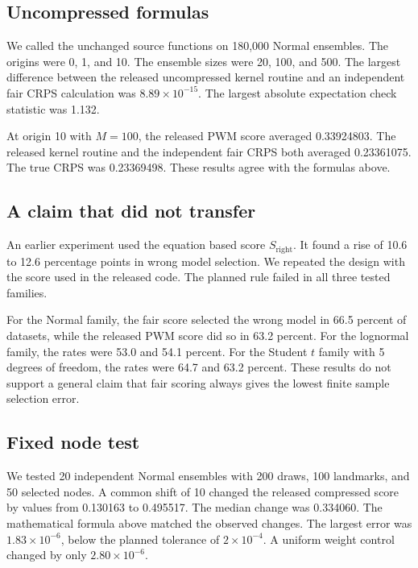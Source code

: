 \documentclass[11pt]{article}
\begin{document}
\subsection{Uncompressed formulas}

We called the unchanged source functions on 180,000 Normal ensembles. The origins were 0, 1, and 10. The ensemble sizes were 20, 100, and 500. The largest difference between the released uncompressed kernel routine and an independent fair CRPS calculation was $8.89\times10^{-15}$. The largest absolute expectation check statistic was 1.132.

At origin 10 with $M=100$, the released PWM score averaged 0.33924803. The released kernel routine and the independent fair CRPS both averaged 0.23361075. The true CRPS was 0.23369498. These results agree with the formulas above.

\subsection{A claim that did not transfer}

An earlier experiment used the equation based score $S_{\mathrm{right}}$. It found a rise of 10.6 to 12.6 percentage points in wrong model selection. We repeated the design with the score used in the released code. The planned rule failed in all three tested families.

For the Normal family, the fair score selected the wrong model in 66.5 percent of datasets, while the released PWM score did so in 63.2 percent. For the lognormal family, the rates were 53.0 and 54.1 percent. For the Student $t$ family with 5 degrees of freedom, the rates were 64.7 and 63.2 percent. These results do not support a general claim that fair scoring always gives the lowest finite sample selection error.

\subsection{Fixed node test}

We tested 20 independent Normal ensembles with 200 draws, 100 landmarks, and 50 selected nodes. A common shift of 10 changed the released compressed score by values from 0.130163 to 0.495517. The median change was 0.334060. The mathematical formula above matched the observed changes. The largest error was $1.83\times10^{-6}$, below the planned tolerance of $2\times10^{-4}$. A uniform weight control changed by only $2.80\times10^{-6}$.
\end{document}

